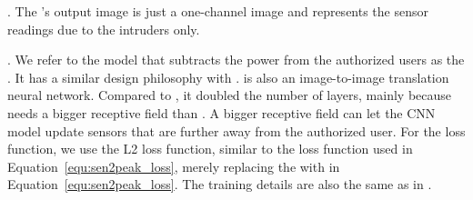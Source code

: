 . 
The \subtract's output image is just a one-channel image and represents the sensor readings due to the intruders only.  

.
We refer to the model that subtracts the power from the authorized users as the \subtract. 
It has a similar design philosophy with \imgimg.
\subtract is also an image-to-image translation neural network.
Compared to \imgimg, it doubled the number of layers, mainly because \subtract needs a bigger receptive field than \imgimg.
A bigger receptive field can let the CNN model update sensors that are further away from the authorized user.
For the loss function, we use the L2 loss function, similar to the loss function used in Equation~\ref{equ:sen2peak_loss}, merely replacing the \imgimg with \subtract in Equation~\ref{equ:sen2peak_loss}.
The training details are also the same as in \imgimg.
